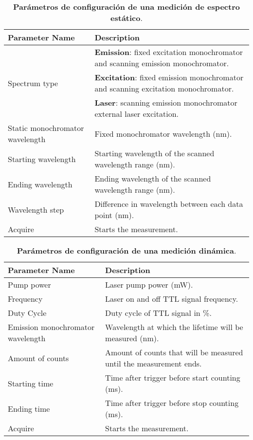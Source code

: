 \begin{table}
    \centering
    \begin{tabularx}{\textwidth}{|l|X|}
        \hline
        \textbf{Parameter Name} & \textbf{Description} \\
        \hline
        \multirow{3}{3cm}{Spectrum type} & \textbf{Emission}: fixed excitation monochromator and scanning emission monochromator. \\
        \cline{2-2}
        & \textbf{Excitation}: fixed emission monochromator and scanning excitation monochromator. \\
        \cline{2-2}
        & \textbf{Laser}: scanning emission monochromator external laser excitation. \\
        \hline
        Static monochromator wavelength & Fixed monochromator wavelength (nm). \\
        \hline
        Starting wavelength & Starting wavelength of the scanned wavelength range (nm). \\
        \hline
        Ending wavelength & Ending wavelength of the scanned wavelength range (nm). \\
        \hline
        Wavelength step & Difference in wavelength between each data point (nm). \\
        \hline
        Acquire & Starts the measurement. \\
        \hline
    \end{tabularx}
    \caption{\textbf{Parámetros de configuración de una medición de espectro estático}.}
    \label{tab:spectrum_measurement}
\end{table}

\begin{table}[htbp]
    \centering
    \begin{tabularx}{\textwidth}{|l|X|}
        \hline
        \textbf{Parameter Name} & \textbf{Description} \\
        \hline
        Pump power & Laser pump power (mW). \\
        \hline
        Frequency & Laser on and off TTL signal frequency. \\
        \hline
        Duty Cycle & Duty cycle of TTL signal in \%. \\
        \hline
        Emission monochromator wavelength & Wavelength at which the lifetime will be measured (nm). \\
        \hline 
        Amount of counts & Amount of counts that will be measured until the measurement ends. \\
        \hline
        Starting time & Time after trigger before start counting (ms). \\
        \hline
        Ending time & Time after trigger before stop counting (ms). \\
        \hline
        Acquire & Starts the measurement.\\
        \hline
    \end{tabularx}
    \caption{\textbf{Parámetros de configuración de una medición dinámica}.}
    \label{tab:lifetime_measurement}
\end{table}

